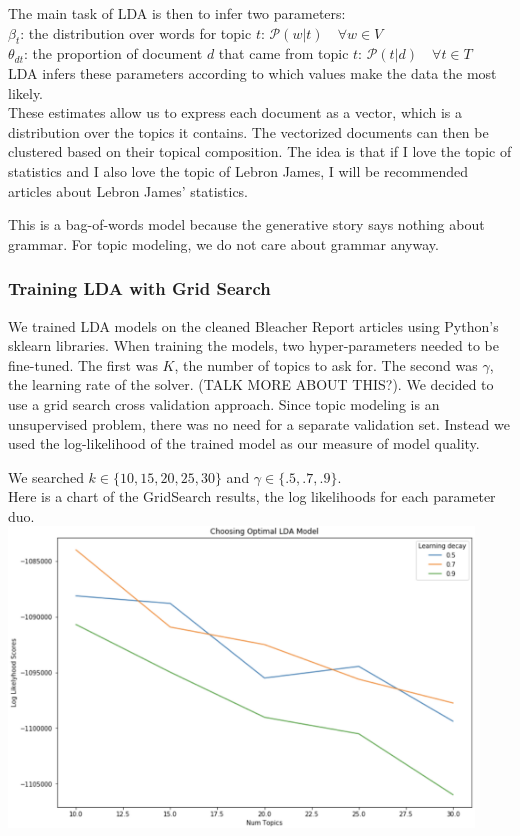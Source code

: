 \documentclass[11pt]{article}
\begin{document}
The main task of LDA is then to infer two parameters: \\
$\beta_t$: the distribution over words for topic $t$: $\mathcal{P}(w | t) \quad \forall w \in V$ \\
$\theta_{dt}$: the proportion of document $d$ that came from topic $t$: $\mathcal{P}(t | d) \quad \forall t \in T$ \\

LDA infers these parameters according to which values make the data the most likely. \\

These estimates allow us to express each document as a vector, which is a distribution over the topics it contains.  The vectorized documents can then be clustered based on their topical composition. The idea is that if I love the topic of statistics and I also love the topic of Lebron James, I will be recommended articles about Lebron James' statistics. 

This is a bag-of-words model because the generative story says nothing about grammar. For topic modeling, we do not care about grammar anyway.    

\subsubsection{Training LDA with Grid Search}
We trained LDA models on the cleaned Bleacher Report articles using Python's sklearn libraries.  When training the models, two hyper-parameters needed to be fine-tuned. The first was $K$, the number of topics to ask for.  The second was $\gamma$, the learning rate of the solver.  (TALK MORE ABOUT THIS?). We decided to use a grid search cross validation approach. Since topic modeling is an unsupervised problem, there was no need for a separate validation set.  Instead we used the log-likelihood of the trained model as our measure of model quality. 

We searched $k \in \{10, 15, 20, 25, 30\}$ and $\gamma \in \{.5, .7, .9\}$.\\
Here is a chart of the GridSearch results, the log likelihoods for each parameter duo. \\

\includegraphics[width=350pt]{gridsearch.png} \\
\end{document}
